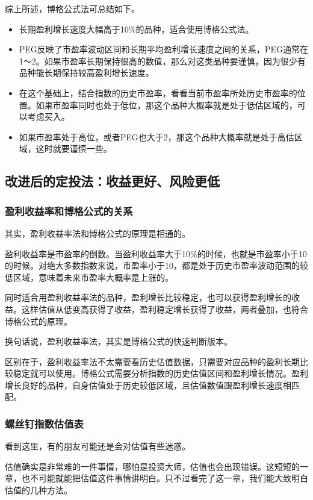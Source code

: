 综上所述，博格公式法可总结如下。

\begin{itemize}
\item 长期盈利增长速度大幅高于10\%的品种，适合使用博格公式法。
\item PEG反映了市盈率波动区间和长期平均盈利增长速度之间的关系，PEG通常在1～2。如果市盈率长期保持很高的数值，那么对这类品种要谨慎，因为很少有品种能长期保持较高盈利增长速度。
\item 在这个基础上，结合指数的历史市盈率，看看当前市盈率所处历史市盈率的位置。如果市盈率同时也处于低位，那这个品种大概率就是处于低估区域的，可以考虑买入。
\item 如果市盈率处于高位，或者PEG也大于2，那这个品种大概率就是处于高估区域，这时就要谨慎一些。
\end{itemize}

\subsection{改进后的定投法：收益更好、风险更低}
\subsubsection{盈利收益率和博格公式的关系}

其实，盈利收益率法和博格公式的原理是相通的。

盈利收益率是市盈率的倒数。当盈利收益率大于10\%的时候，也就是市盈率小于10的时候。对绝大多数指数来说，市盈率小于10，都是处于历史市盈率波动范围的较低区域，意味着未来市盈率大概率是上涨的。

同时适合用盈利收益率法的品种，盈利增长比较稳定，也可以获得盈利增长的收益。这样估值从低变高获得了收益，盈利稳定增长获得了收益，两者叠加，也符合博格公式的原理。

换句话说，盈利收益率法，其实是博格公式的快速判断版本。

区别在于，盈利收益率法不太需要看历史估值数据，只需要对应品种的盈利长期比较稳定就可以使用。博格公式需要分析指数的历史估值区间和盈利增长情况。盈利增长良好的品种，自身估值处于历史较低区域，且估值数值跟盈利增长速度相匹配。

\subsubsection{螺丝钉指数估值表}

看到这里，有的朋友可能还是会对估值有些迷惑。

估值确实是非常难的一件事情，哪怕是投资大师，估值也会出现错误。这短短的一章，也不可能就能把估值这件事情讲明白。只不过看完了这一章，我们能大致明白估值的几种方法。

